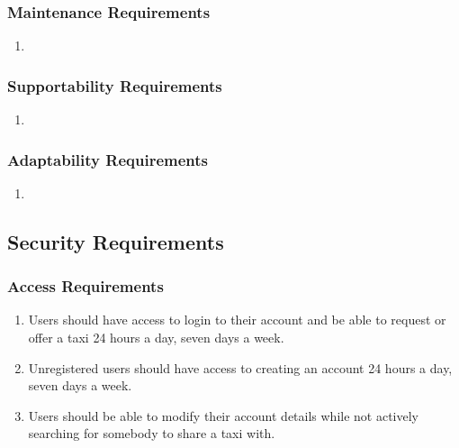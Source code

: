 \documentclass[]{article}
\begin{document}
\subsubsection{Maintenance Requirements}
\label{ssub:maintenance_requirements}
\begin{enumerate}[{MS}1. ]
	\item 
\end{enumerate}

\subsubsection{Supportability Requirements}
\label{ssub:supportability_requirements}
\begin{enumerate}[{MS}1. ]
	\item 
\end{enumerate}

\subsubsection{Adaptability Requirements}
\label{ssub:adaptability_requirements}
\begin{enumerate}[{MS}1. ]
	\item 
\end{enumerate}


\subsection{Security Requirements}
\label{sub:security_requirements}

\subsubsection{Access Requirements}
\label{ssub:access_requirements}
\begin{enumerate}[{SR}1. ]
	\item Users should have access to login to their account and be able to request or offer a taxi 24 hours a day, seven days a week.
	\item Unregistered users should have access to creating an account 24 hours a day, seven days a week.
	\item Users should be able to modify their account details while not actively searching for somebody to share a taxi with.
\end{enumerate}
\end{document}
